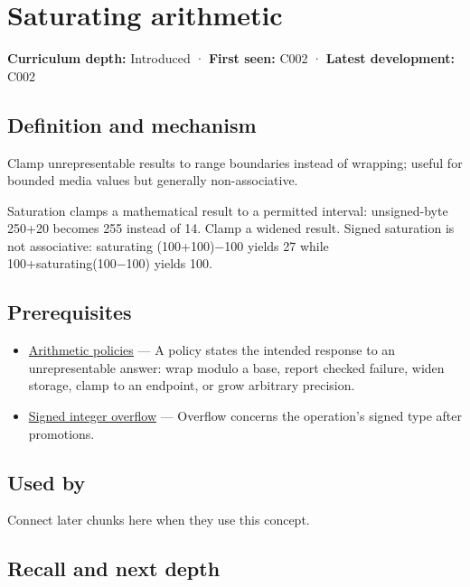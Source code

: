 \hypertarget{appendix-3999c6209649}{}\label{referencestart:appendix-3999c6209649}
\section{Saturating arithmetic}\label{appendix-3999c6209649-saturating-arithmetic}

\textbf{Curriculum depth:} Introduced · \textbf{First seen:} C002 · \textbf{Latest development:} C002

\subsection{Definition and mechanism}\label{appendix-3999c6209649-definition-and-mechanism}

Clamp unrepresentable results to range boundaries instead of wrapping; useful for bounded media values but generally non-associative.

Saturation clamps a mathematical result to a permitted interval: unsigned-byte 250+20 becomes 255 instead of 14. Clamp a widened result. Signed saturation is not associative: saturating (100+100)−100 yields 27 while 100+saturating(100−100) yields 100.

\subsection{Prerequisites}\label{appendix-3999c6209649-prerequisites}

\begin{itemize}
\tightlist
\item
  \hyperref[appendix-2ed044358b82]{Arithmetic policies} --- A policy states the intended response to an unrepresentable answer: wrap modulo a base, report checked failure, widen storage, clamp to an endpoint, or grow arbitrary precision.
\item
  \hyperref[appendix-1a599c924a4e]{Signed integer overflow} --- Overflow concerns the operation's signed type after promotions.
\end{itemize}

\subsection{Used by}\label{appendix-3999c6209649-used-by}

Connect later chunks here when they use this concept.

\subsection{Recall and next depth}\label{appendix-3999c6209649-recall-and-next-depth}

